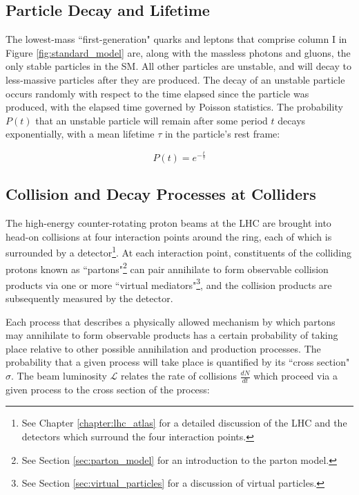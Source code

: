 \subsection{Particle Decay and Lifetime}

The lowest-mass ``first-generation" quarks and leptons that comprise column I in Figure \ref{fig:standard_model} are, along with the massless photons and gluons, the only stable particles in the SM. All other particles are unstable, and will decay to less-massive particles after they are produced. The decay of an unstable particle occurs randomly with respect to the time elapsed since the particle was produced, with the elapsed time governed by Poisson statistics. The probability \(P(t)\) that an unstable particle will remain after some period \(t\) decays exponentially, with a mean lifetime \(\tau\) in the particle's rest frame:

\begin{equation}
\label{eq:particle_decay}
P(t) = e^{-\frac{t}{\tau}} %
\end{equation}


\subsection{Collision and Decay Processes at Colliders}
\label{sec:col_decay_procs}

The high-energy counter-rotating proton beams at the LHC are brought into head-on collisions at four interaction points around the ring, each of which is surrounded by a detector\footnote{See Chapter \ref{chapter:lhc_atlas} for a detailed discussion of the LHC and the detectors which surround the four interaction points.}. At each interaction point, constituents of the colliding protons known as ``partons"\footnote{See Section \ref{sec:parton_model} for an introduction to the parton model.} can pair annihilate to form observable collision products via one or more ``virtual mediators"\footnote{See Section \ref{sec:virtual_particles} for a discussion of virtual particles.}, and the collision products are subsequently measured by the detector. 

Each process that describes a physically allowed mechanism by which partons may annihilate to form observable products has a certain probability of taking place relative to other possible annihilation and production processes. The probability that a given process will take place is quantified by its ``cross section" \(\sigma\). The beam luminosity \(\mathcal{L}\) relates the rate of collisions \(\frac{dN}{dt}\) which proceed via a given process to the cross section of the process:

